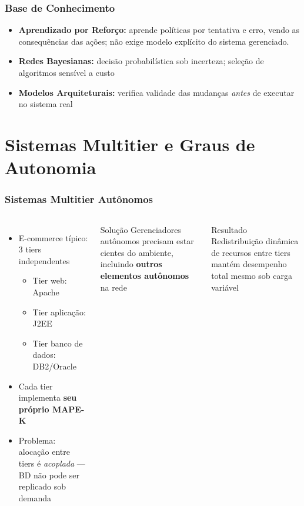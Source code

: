 \documentclass{beamer}
\begin{document}
  
  \begin{frame}
    \frametitle{Base de Conhecimento}
    \begin{itemize}
      \item \textbf{Aprendizado por Reforço:} aprende políticas por tentativa e erro, vendo as consequências das ações; não exige modelo explícito do sistema gerenciado. 
      \item \textbf{Redes Bayesianas:} decisão probabilística sob incerteza; seleção de algoritmos sensível a custo
      \item \textbf{Modelos Arquiteturais:} verifica validade das mudanças \textit{antes} de executar no sistema real
    \end{itemize}
  \end{frame}

  \section{Sistemas Multitier e Graus de Autonomia}

  \begin{frame}
      \frametitle{Sistemas Multitier Autônomos}
      \begin{columns}
        \begin{itemize}
          \item E-commerce típico: 3 tiers independentes
          \begin{itemize}
            \item Tier web: Apache
            \item Tier aplicação: J2EE
            \item Tier banco de dados: DB2/Oracle
          \end{itemize}
          \item Cada tier implementa \textbf{seu próprio MAPE-K}
          \item Problema: alocação entre tiers é \textit{acoplada} --- BD não pode ser replicado sob demanda
        \end{itemize}
        \begin{block}{Solução}
          Gerenciadores autônomos precisam estar cientes do ambiente, incluindo \textbf{outros elementos autônomos} na rede
        \end{block}
        \vspace{0.3cm}
        \begin{alertblock}{Resultado}
          Redistribuição dinâmica de recursos entre tiers mantém desempenho total mesmo sob carga variável
        \end{alertblock}
      \end{columns}
  \end{frame}
\end{document}
